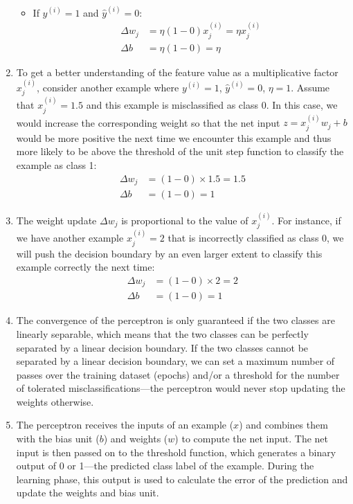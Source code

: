 \documentclass[../machine_learning_scikit.tex]{subfiles}
\begin{document}
\begin{enumerate}
\begin{itemize}
            \item If $y^{(i)} = 1$ and $\hat{y}^{(i)} = 0$:
            \begin{align*}
            \Delta w_j &= \eta(1 - 0)x_j^{(i)} = \eta x_j^{(i)} \\
            \Delta b &= \eta(1 - 0) = \eta
            \end{align*}
        \end{itemize}

        \item To get a better understanding of the feature value as a multiplicative factor $x_j^{(i)}$, consider another example where $y^{(i)} = 1$, $\hat{y}^{(i)} = 0$, $\eta = 1$. Assume that $x_j^{(i)} = 1.5$ and this example is misclassified as class 0. In this case, we would increase the corresponding weight so that the net input $z = x_j^{(i)}w_j + b$ would be more positive the next time we encounter this example and thus more likely to be above the threshold of the unit step function to classify the example as class 1:
        \begin{align*}
        \Delta w_j &= (1 - 0) \times 1.5 = 1.5 \\
        \Delta b &= (1 - 0) = 1
        \end{align*}

        \item The weight update $\Delta w_j$ is proportional to the value of $x_j^{(i)}$. For instance, if we have another example $x_j^{(i)} = 2$ that is incorrectly classified as class 0, we will push the decision boundary by an even larger extent to classify this example correctly the next time:
        \begin{align*}
        \Delta w_j &= (1 - 0) \times 2 = 2 \\
        \Delta b &= (1 - 0) = 1
        \end{align*}

        \item The convergence of the perceptron is only guaranteed if the two classes are linearly separable, which means that the two classes can be perfectly separated by a linear decision boundary. If the two classes cannot be separated by a linear decision boundary, we can set a maximum number of passes over the training dataset (epochs) and/or a threshold for the number of tolerated misclassifications—the perceptron would never stop updating the weights otherwise.

        \item The perceptron receives the inputs of an example ($x$) and combines them with the bias unit ($b$) and weights ($w$) to compute the net input. The net input is then passed on to the threshold function, which generates a binary output of 0 or 1—the predicted class label of the example. During the learning phase, this output is used to calculate the error of the prediction and update the weights and bias unit.
    \end{enumerate}
\end{document}
